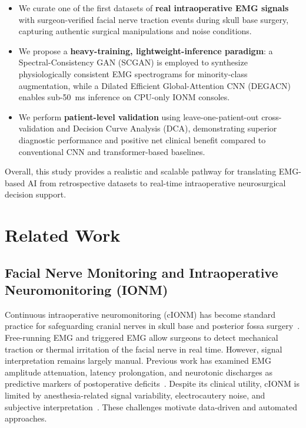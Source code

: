 \documentclass[10pt]{article}
\begin{document}
\begin{itemize}
    \item We curate one of the first datasets of \textbf{real intraoperative EMG signals} with surgeon-verified facial nerve traction events during skull base surgery, capturing authentic surgical manipulations and noise conditions.
    \item We propose a \textbf{heavy-training, lightweight-inference paradigm}: a Spectral-Consistency GAN (SCGAN) is employed to synthesize physiologically consistent EMG spectrograms for minority-class augmentation, while a Dilated Efficient Global-Attention CNN (DEGACN) enables sub-\SI{50}{ms} inference on CPU-only IONM consoles.
    \item We perform \textbf{patient-level validation} using leave-one-patient-out cross-validation and Decision Curve Analysis (DCA), demonstrating superior diagnostic performance and positive net clinical benefit compared to conventional CNN and transformer-based baselines.
\end{itemize}

Overall, this study provides a realistic and scalable pathway for translating EMG-based AI from retrospective datasets to real-time intraoperative neurosurgical decision support.

\section{Related Work}

\subsection{Facial Nerve Monitoring and Intraoperative Neuromonitoring (IONM)}

Continuous intraoperative neuromonitoring (cIONM) has become standard practice for safeguarding cranial nerves in skull base and posterior fossa surgery~\cite{Thyroid_cIONM_Guideline_2018,FacialNerve_cIONM_Review_2024}. Free-running EMG and triggered EMG allow surgeons to detect mechanical traction or thermal irritation of the facial nerve in real time. However, signal interpretation remains largely manual. Previous work has examined EMG amplitude attenuation, latency prolongation, and neurotonic discharges as predictive markers of postoperative deficits~\cite{FreeRunning_EMG_Risk_2022}. Despite its clinical utility, cIONM is limited by anesthesia-related signal variability, electrocautery noise, and subjective interpretation~\cite{IONM_Review_2023}. These challenges motivate data-driven and automated approaches.
\end{document}
